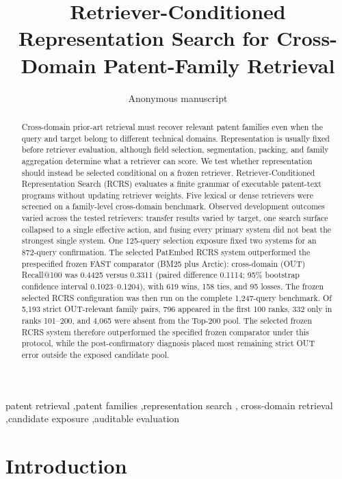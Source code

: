 \documentclass[final,5p,times,twocolumn]{elsarticle}
\newcommand{\RCRS}{RCRS}
\begin{document}
\begin{frontmatter}

\title{Retriever-Conditioned Representation Search for Cross-Domain Patent-Family Retrieval}

\author{Anonymous manuscript}

\begin{abstract}
Cross-domain prior-art retrieval must recover relevant patent families even
when the query and target belong to different technical domains. Representation is
usually fixed before retriever evaluation, although field selection,
segmentation, packing, and family aggregation determine what a retriever can
score. We test whether representation should instead be selected conditional
on a frozen retriever. Retriever-Conditioned Representation Search (\RCRS{})
evaluates a finite grammar of executable patent-text programs without updating
retriever weights. Five lexical or dense retrievers were screened on a
family-level cross-domain benchmark. Observed development outcomes varied
across the tested retrievers:
transfer results varied by target, one search surface collapsed to a single
effective action, and fusing every primary system did not beat the strongest
single system. One 125-query selection exposure fixed two systems for an
872-query confirmation. The selected PatEmbed RCRS system outperformed the
prespecified frozen FAST comparator (BM25 plus Arctic): cross-domain (OUT)
Recall@100 was 0.4425 versus 0.3311 (paired difference 0.1114; 95\% bootstrap confidence interval
0.1023--0.1204), with 619 wins, 158 ties, and 95 losses. The frozen selected RCRS configuration was
then run on the complete 1,247-query benchmark. Of 5,193 strict OUT-relevant
family pairs, 796 appeared in the first 100 ranks, 332 only in ranks 101--200,
and 4,065 were absent from the Top-200 pool. The selected frozen RCRS system
therefore outperformed the specified frozen comparator under this protocol, while the
post-confirmatory diagnosis placed most remaining strict OUT error outside the
exposed candidate pool.
\end{abstract}

\begin{keyword}
patent retrieval \sep patent families \sep representation search \sep
cross-domain retrieval \sep candidate exposure \sep auditable evaluation
\end{keyword}

\end{frontmatter}

\section{Introduction}
\end{document}
